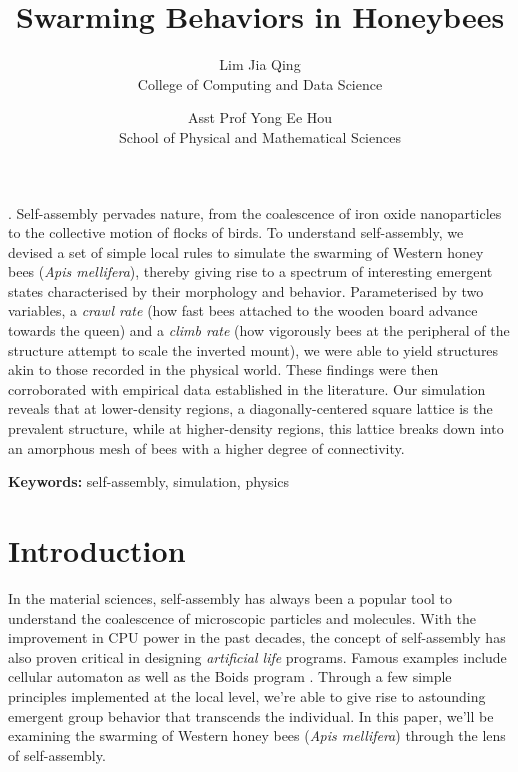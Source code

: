 \documentclass[a4paper,11pt]{article}
\title{Swarming Behaviors in Honeybees}
\date{}
\author{
    {Lim Jia Qing} \\
    College of Computing and Data Science  \\
    \and
    {Asst Prof Yong Ee Hou} \\
    School of Physical and Mathematical Sciences \\
}
\renewenvironment{abstract}{
    \small
\noindent\textbf{\textit{\abstractname}}.\hspace{1em}} %
{}
\begin{document}
\maketitle


\begin{abstract}
    Self-assembly pervades nature, from the coalescence of iron oxide nanoparticles
    to the collective motion of flocks of birds. To understand self-assembly, we
    devised a set of simple local rules to simulate the swarming of Western
    honey bees (\textit{Apis mellifera}), thereby giving rise to a spectrum of
    interesting emergent states characterised by their morphology and behavior.
    Parameterised by two variables, a \textit{crawl rate} (how fast bees attached
    to the wooden board advance towards the queen) and a \textit{climb rate} (how
    vigorously bees at the peripheral of the structure attempt to scale the inverted
    mount), we were able to yield structures akin to those recorded in the
    physical world. These findings were then corroborated with empirical data established
    in the literature. Our simulation reveals that at lower-density
    regions, a diagonally-centered square lattice is the prevalent structure, while
    at higher-density regions, this lattice breaks down into an amorphous mesh
    of bees with a higher degree of connectivity.
\end{abstract}

\textbf{Keywords:} self-assembly, simulation, physics

\section{Introduction}

In the material sciences, self-assembly has always been a popular tool to understand the
coalescence of microscopic particles and molecules. With the improvement in CPU power in the past
decades, the concept of self-assembly has also proven critical in designing \textit{artificial life}
programs. Famous examples include cellular automaton \cite{fetecau2012mathematical} as well as
the Boids program \cite{reynolds1987flocks}. Through a few simple principles implemented at
the local level, we're able to give rise to astounding emergent group behavior that transcends
the individual. In this paper, we'll be examining the swarming of Western honey bees
(\textit{Apis mellifera}) through the lens of self-assembly.
\end{document}
